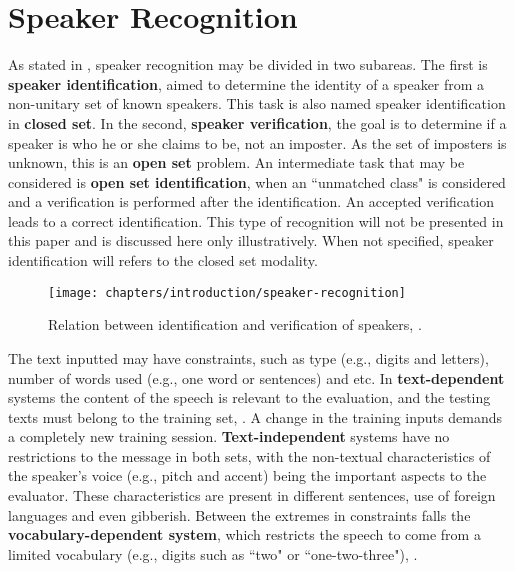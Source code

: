 \section{Speaker Recognition}
\label{sec:speaker-recognition}

As stated in , speaker recognition may be divided in two subareas. The first is \textbf{speaker identification}, aimed to determine the identity of a speaker from a non-unitary set of known speakers. This task is also named speaker identification in \textbf{closed set}. In the second, \textbf{speaker verification}, the goal is to determine if a speaker is who he or she claims to be, not an imposter. As the set of imposters is unknown, this is an \textbf{open set} problem. An intermediate task that may be considered is \textbf{open set identification}, when an ``unmatched class" is considered and a verification is performed after the identification. An accepted verification leads to a correct identification. This type of recognition will not be presented in this paper and is discussed here only illustratively. When not specified, speaker identification will refers to the closed set modality.

\begin{figure}[ht]
    \centering
    \texttt{[image: chapters/introduction/speaker-recognition]}
    \caption{Relation between identification and verification of speakers, .}
    \label{fig:speaker-recognition}
\end{figure}

The text inputted may have constraints, such as type (e.g., digits and letters), number of words used (e.g., one word or sentences) and etc. In \textbf{text-dependent} systems the content of the speech is relevant to the evaluation, and the testing texts must belong to the training set, . A change in the training inputs demands a completely new training session. \textbf{Text-independent} systems have no restrictions to the message in both sets, with the non-textual characteristics of the speaker's voice (e.g., pitch and accent) being the important aspects to the evaluator. These characteristics are present in different sentences, use of foreign languages and even gibberish. Between the extremes in constraints falls the \textbf{vocabulary-dependent system}, which restricts the speech to come from a limited vocabulary (e.g., digits such as ``two" or ``one-two-three"), .

